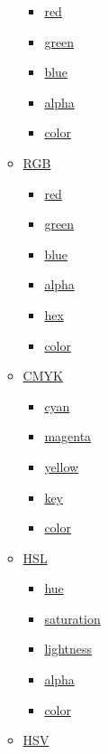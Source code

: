 \begin{itemize}
\begin{itemize}
    \begin{itemize}
    \tightlist
    \item
      \hyperref[definitions-linear-rgb-red]{red}
    \item
      \hyperref[definitions-linear-rgb-green]{green}
    \item
      \hyperref[definitions-linear-rgb-blue]{blue}
    \item
      \hyperref[definitions-linear-rgb-alpha]{alpha}
    \item
      \hyperref[definitions-linear-rgb-color]{color}
    \end{itemize}
  \item
    \hyperref[definitions-rgb]{RGB}

    \begin{itemize}
    \tightlist
    \item
      \hyperref[definitions-rgb-red]{red}
    \item
      \hyperref[definitions-rgb-green]{green}
    \item
      \hyperref[definitions-rgb-blue]{blue}
    \item
      \hyperref[definitions-rgb-alpha]{alpha}
    \item
      \hyperref[definitions-rgb-hex]{hex}
    \item
      \hyperref[definitions-rgb-color]{color}
    \end{itemize}
  \item
    \hyperref[definitions-cmyk]{CMYK}

    \begin{itemize}
    \tightlist
    \item
      \hyperref[definitions-cmyk-cyan]{cyan}
    \item
      \hyperref[definitions-cmyk-magenta]{magenta}
    \item
      \hyperref[definitions-cmyk-yellow]{yellow}
    \item
      \hyperref[definitions-cmyk-key]{key}
    \item
      \hyperref[definitions-cmyk-color]{color}
    \end{itemize}
  \item
    \hyperref[definitions-hsl]{HSL}

    \begin{itemize}
    \tightlist
    \item
      \hyperref[definitions-hsl-hue]{hue}
    \item
      \hyperref[definitions-hsl-saturation]{saturation}
    \item
      \hyperref[definitions-hsl-lightness]{lightness}
    \item
      \hyperref[definitions-hsl-alpha]{alpha}
    \item
      \hyperref[definitions-hsl-color]{color}
    \end{itemize}
  \item
    \hyperref[definitions-hsv]{HSV}


\end{itemize}
\end{itemize}
